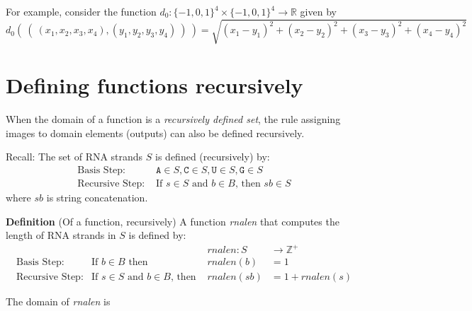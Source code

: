 \documentclass[12pt, oneside]{article}
\newcommand{\A}[0]{\texttt{A}}
\newcommand{\C}[0]{\texttt{C}}
\newcommand{\G}[0]{\texttt{G}}
\newcommand{\U}[0]{\texttt{U}}
\newcommand{\cmark}{\ding{51}}
\newcommand{\xmark}{\ding{55}}
\begin{document}
For example, consider the function 
$d_0: \{-1,0,1\}^4 \times \{-1,0,1\}^4 \to \mathbb{R}$
given by
\[
d_0 (~(~ (x_1, x_2, x_3, x_4), (y_1, y_2, y_3, y_4) ~) ~) = \sqrt{ (x_1 - y_1)^2 + (x_2 - y_2)^2 + (x_3 -y_3)^2 + (x_4 -y_4)^2}
\]


\vfill
\vfill

\newpage \vfill
\section*{Defining functions recursively}


When the domain of a function is a {\it recursively defined set}, the rule assigning 
images to domain elements (outputs) can also be defined recursively.

Recall: The set of RNA strands $S$ is defined (recursively) by:
\[
\begin{array}{ll}
\textrm{Basis Step: } & \A \in S, \C \in S, \U \in S, \G \in S \\
\textrm{Recursive Step: } & \textrm{If } s \in S\textrm{ and }b \in B \textrm{, then }sb \in S
\end{array}
\]
where $sb$ is string concatenation.

{\bf Definition} (Of a function, recursively) A function \textit{rnalen} that computes the length of RNA strands in $S$ is defined by:
\[
\begin{array}{llll}
& & \textit{rnalen} : S & \to \mathbb{Z}^+ \\
\textrm{Basis Step:} & \textrm{If } b \in B\textrm{ then } & \textit{rnalen}(b) & = 1 \\
\textrm{Recursive Step:} & \textrm{If } s \in S\textrm{ and }b \in B\textrm{, then  } & \textit{rnalen}(sb) & = 1 + \textit{rnalen}(s)
\end{array}
\]

The domain of \textit{rnalen} is \phantom{$S$}\\
\end{document}

